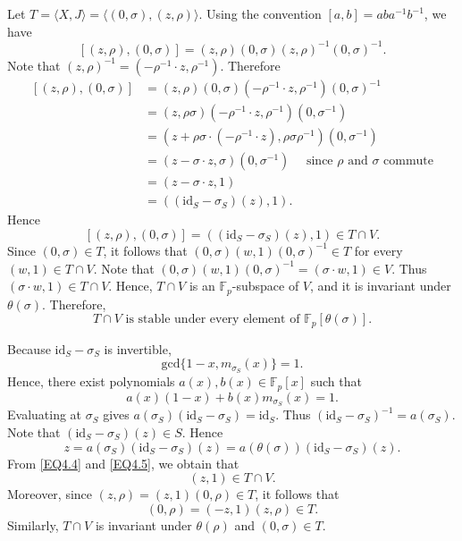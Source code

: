 \documentclass[12pt]{article}
\begin{document}
Let $T=\langle X,J\rangle=\langle (0,\sigma), (z,\rho)\rangle$. 
Using the convention $[a, b]=aba^{-1}b^{-1}$, we have 
$$[(z,\rho), (0,\sigma)]=(z,\rho)(0,\sigma)(z,\rho)^{-1}(0,\sigma)^{-1}.$$
Note that $(z,\rho)^{-1}=(-\rho^{-1}\cdot z,\rho^{-1})$. Therefore 
\begin{equation*}
\begin{aligned}
	 [(z,\rho), (0,\sigma)] & =(z,\rho)(0,\sigma)(-\rho^{-1}\cdot z,\rho^{-1}) (0,\sigma)^{-1}\\
& = (z,\rho\sigma)(-\rho^{-1}\cdot z,\rho^{-1}) (0,\sigma^{-1})\\
& = (z+\rho\sigma\cdot (-\rho^{-1}\cdot z),\rho\sigma\rho^{-1})(0,\sigma^{-1})\\
& = (z-\sigma\cdot z,\sigma)(0,\sigma^{-1}) \quad\mbox{ since } \rho \mbox{ and }\sigma \mbox{ commute}\\
& = (z-\sigma\cdot z,1)\\
& = ((\mbox{id}_S-\sigma_S)(z),1).
\end{aligned}    
\end{equation*}
Hence 
\begin{equation}\label{EQ4.4}
[(z,\rho), (0,\sigma)]=((\mbox{id}_S-\sigma_S)(z),1)\in T\cap V.   \end{equation}
Since $(0,\sigma)\in T$, it follows that $(0,\sigma)(w,1)(0,\sigma)^{-1}\in T$ for every $(w,1)\in T\cap V$.
Note that $(0,\sigma)(w,1)(0,\sigma)^{-1}=(\sigma\cdot w,1)\in V$. Thus $(\sigma\cdot w, 1)\in T\cap V$. Hence, $T\cap V$ is an $\mathbb{F}_p$-subspace of $V$, and it is
invariant under $\theta(\sigma)$. Therefore, 
\begin{equation}\label{EQ4.5}
T\cap V  \mbox{ is stable under every element of } \mathbb{F}_p[\theta(\sigma)].
\end{equation} 

Because $\mbox{id}_S-\sigma_S$ is invertible, 
$$\mbox{gcd}\{1-x,m_{\sigma_S}(x)\}=1.$$
Hence, there exist polynomials $a(x), b(x)\in\mathbb{F}_p[x]$ such that
$$a(x)(1-x)+b(x)m_{\sigma_S}(x)=1.$$
Evaluating at $\sigma_S$ gives $a(\sigma_S)(\mbox{id}_S-\sigma_S)=\mbox{id}_S$. Thus $(\mbox{id}_S-\sigma_S)^{-1}=a(\sigma_S)$.
Note that $(\mbox{id}_S-\sigma_S)(z)\in S$. Hence
$$z=a(\sigma_S)(\mbox{id}_S-\sigma_S)(z)=a(\theta(\sigma))(\mbox{id}_S-\sigma_S)(z).$$
From \eqref{EQ4.4} and \eqref{EQ4.5}, we obtain that $$(z,1)\in T\cap V.$$ Moreover, since $(z,\rho)=(z,1)(0, \rho)\in T$, it follows that $$(0, \rho)=(-z,1)(z,\rho)\in T.$$
Similarly, $T\cap V$ is invariant under $\theta(\rho)$ and $(0, \sigma)\in T$.
\end{document}
